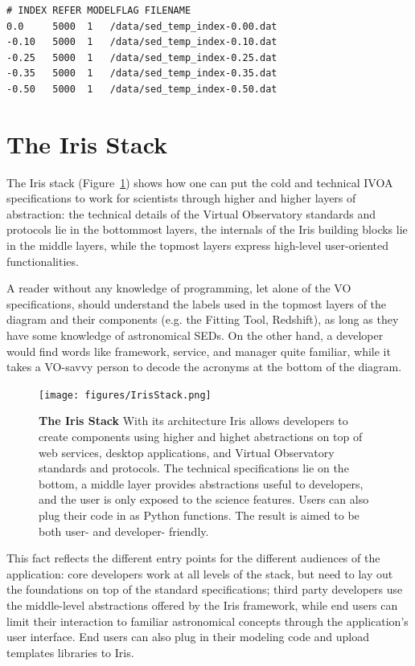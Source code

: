 \documentclass[final,5p]{elsarticle}
\begin{document}
\begin{lstlisting}[style=code,
	caption=Example of template library definition file,
	label=lst:templateconfig]
# INDEX REFER MODELFLAG FILENAME
0.0     5000  1   /data/sed_temp_index-0.00.dat
-0.10   5000  1   /data/sed_temp_index-0.10.dat
-0.25   5000  1   /data/sed_temp_index-0.25.dat
-0.35   5000  1   /data/sed_temp_index-0.35.dat
-0.50   5000  1   /data/sed_temp_index-0.50.dat
\end{lstlisting}


\section{The Iris Stack}
\label{sec:stack}

The Iris stack (Figure~\ref{fig:stack}) shows how one can put the cold and technical IVOA specifications to work for scientists through higher and higher layers of abstraction: the technical details of the Virtual Observatory standards and protocols lie in the bottommost layers, the internals of the Iris building blocks lie in the middle layers, while the topmost layers express high-level user-oriented functionalities.

A reader without any knowledge of programming, let alone of the VO specifications, should understand the labels used in the topmost layers of the diagram and their components (e.g. the Fitting Tool, Redshift), as long as they have some knowledge of astronomical SEDs. On the other hand, a developer would find words like framework, service, and manager quite familiar, while it takes a VO-savvy person to decode the acronyms at the bottom of the diagram.

\begin{figure}
\begin{center}
\texttt{[image: figures/IrisStack.png]}
\caption{\textbf{The Iris Stack} With its architecture Iris allows developers to create components using higher and highet abstractions on top of web services, desktop applications, and Virtual Observatory standards and protocols. The technical specifications lie on the bottom, a middle layer provides abstractions useful to developers, and the user is only exposed to the science features. Users can also plug their code in as Python functions. The result is aimed to be both user- and developer- friendly.}
\label{fig:stack}
\end{center}
\end{figure}

This fact reflects the different entry points for the different audiences of the application: core developers work at all levels of the stack, but need to lay out the foundations on top of the standard specifications; third party developers use the middle-level abstractions offered by the Iris framework, while end users can limit their interaction to familiar astronomical concepts through the application's user interface. End users can also plug in their modeling code and upload templates libraries to Iris.
\end{document}
